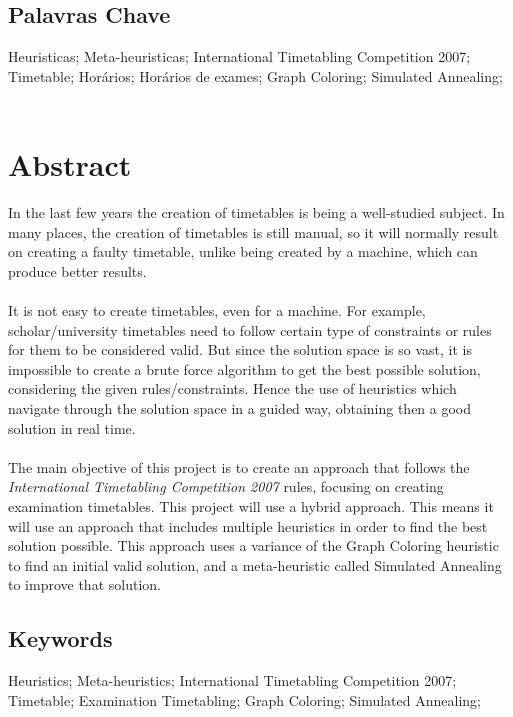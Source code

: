 \section*{Palavras Chave}

Heuristicas; Meta-heuristicas; International Timetabling Competition 2007; Timetable; Horários; Horários de exames; Graph Coloring; Simulated Annealing;
\

\chapter*{Abstract}

In the last few years the creation of timetables is being a well-studied subject. In many places, the creation of timetables is still manual, so it will normally result on creating a faulty timetable, unlike being created by a machine, which can produce better results.\\
\\
It is not easy to create timetables, even for a machine. For example, scholar/university timetables need to follow certain type of constraints or rules for them to be considered valid. But since the solution space is so vast, it is impossible to create a brute force algorithm to get the best possible solution, considering the given rules/constraints. Hence the use of heuristics which navigate through the solution space in a guided way, obtaining then a good solution in real time.\\
\\
The main objective of this project is to create an approach that follows the \textit{International Timetabling Competition 2007} rules, focusing on creating examination timetables. This project will use a hybrid approach. This means it will use an approach that includes multiple heuristics in order to find the best solution possible. This approach uses a variance of the Graph Coloring heuristic to find an initial valid solution, and a meta-heuristic called Simulated Annealing to improve that solution.


\section*{Keywords}

Heuristics; Meta-heuristics; International Timetabling Competition 2007; Timetable; Examination Timetabling; Graph Coloring; Simulated Annealing;

